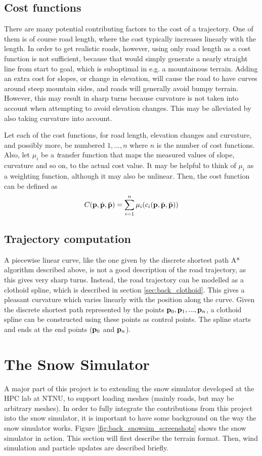 \subsection{Cost functions}
There are many potential contributing factors to the cost of a trajectory. One of them is of course road length, where the cost typically increases linearly with the length. In order to get realistic roads, however, using only road length as a cost function is not sufficient, because that would simply generate a nearly straight line from start to goal, which is suboptimal in e.g. a mountainous terrain. Adding an extra cost for slopes, or change in elevation, will cause the road to have curves around steep mountain sides, and roads will generally avoid bumpy terrain. However, this may result in sharp turns because curvature is not taken into account when attempting to avoid elevation changes. This may be alleviated by also taking curvature into account.

Let each of the cost functions, for road length, elevation changes and curvature, and possibly more, be numbered $1, ..., n$ where $n$ is the number of cost functions. Also, let $\mu_i$ be a {\textit transfer function} that maps the measured values of slope, curvature and so on, to the actual cost value. It may be helpful to think of $\mu_i$ as a weighting function, although it may also be unlinear. Then, the cost function can be defined as
$$
C({\mathbf p}, \dot{{\mathbf p}}, \ddot{\mathbf{p}}) = \sum_{i=1}^{n} \mu_i(c_i({\mathbf p}, \dot{{\mathbf p}}, \ddot{\mathbf{p}}))
$$

\subsection{Trajectory computation}
A piecewise linear curve, like the one given by the discrete shortest path A* algorithm described above, is not a good description of the road trajectory, as this gives very sharp turns. Instead, the road trajectory can be modelled as a clothoid spline\cite{roadgen}, which is described in section \ref{sec:back_clothoid}. This gives a pleasant curvature which varies linearly with the position along the curve\cite{clothoid}. Given the discrete shortest path represented by the points ${\mathbf p}_0, {\mathbf p}_1, ..., {\mathbf p}_n$, a clothoid spline can be constructed using these points as control points. The spline starts and ends at the end points (${\mathbf p}_0$ and ${\mathbf p}_n$). 

\section{The Snow Simulator}
A major part of this project is to extending the snow simulator developed at the HPC lab at NTNU, to support loading meshes (mainly roads, but may be arbitrary meshes). In order to fully integrate the contributions from this project into the snow simulator, it is important to have some background on the way the snow simulator works. Figure \ref{fig:back_snowsim_screenshots} shows the snow simulator in action. This section will first describe the terrain format. Then, wind simulation and particle updates are described briefly.

